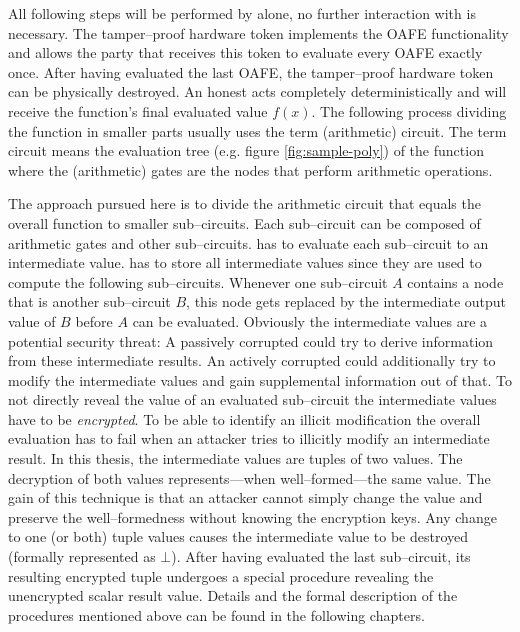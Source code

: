 All following steps will be performed by \JWpTwo{} alone, no further interaction
with \JWpOne{} is necessary. The tamper--proof hardware token implements the
OAFE functionality and allows the party that receives this token to evaluate
every OAFE exactly once. After having evaluated the last OAFE, the tamper--proof
hardware token can be physically destroyed. An honest \JWpTwo{} acts completely
deterministically and will receive the function's final evaluated value $f(x)$.
The following process dividing the function in smaller parts usually uses the
term (arithmetic) circuit. The term circuit means the evaluation tree (e.g.
figure \ref{fig:sample-poly}) of the function where the (arithmetic) gates are
the nodes that perform arithmetic operations.

The approach pursued here is to divide the arithmetic circuit that equals the
overall function to smaller sub--circuits. Each sub--circuit can be composed of
arithmetic gates and other sub--circuits. \JWpTwo{} has to evaluate each
sub--circuit to an intermediate value. \JWpTwo{} has to store all intermediate
values since they are used to compute the following sub--circuits.  Whenever one
sub--circuit $A$ contains a node that is another sub--circuit $B$, this node
gets replaced by the intermediate output value of $B$ before $A$ can be
evaluated. Obviously the intermediate values are a potential security threat: A
passively corrupted \JWpTwo{} could try to derive information from these
intermediate results. An actively corrupted \JWpTwo{} could additionally try to
modify the intermediate values and gain supplemental information out of that. To
not directly reveal the value of an evaluated sub--circuit the intermediate
values have to be \emph{encrypted}.  To be able to identify an illicit
modification the overall evaluation has to fail when an attacker tries to
illicitly modify an intermediate result. In this thesis, the intermediate values
are tuples of two values. The decryption of both values represents---when
well--formed---the same value. The gain of this technique is that an attacker
cannot simply change the value and preserve the well--formedness without knowing
the encryption keys. Any change to one (or both) tuple values causes the
intermediate value to be destroyed (formally represented as $\bot$). After
having evaluated the last sub--circuit, its resulting encrypted tuple undergoes
a special procedure revealing the unencrypted scalar result value. Details and
the formal description of the procedures mentioned above can be found in the
following chapters.

